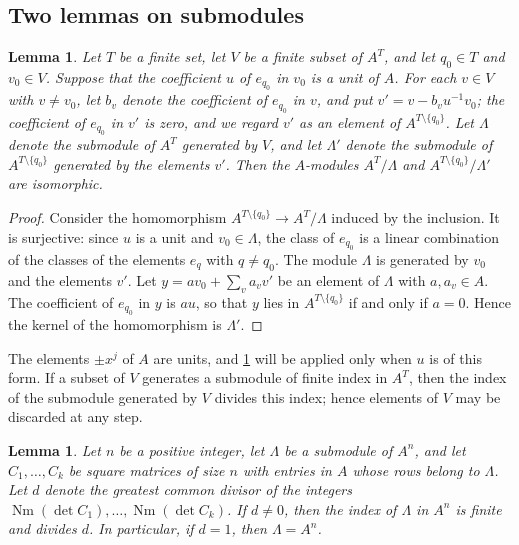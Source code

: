 \documentclass[11pt]{amsart}
\theoremstyle{plain}
\newtheorem{lemma}[theorem]{Lemma}
\theoremstyle{definition}
\begin{document}
\subsection{Two lemmas on submodules}

\begin{lemma} \label{lem:pivot}
Let $T$ be a finite set, let $V$ be a finite subset of $A^T$, and let $q_0 \in T$ and $v_0 \in V$.
Suppose that the coefficient $u$ of $e_{q_0}$ in $v_0$ is a unit of $A$.
For each $v \in V$ with $v \ne v_0$, let $b_v$ denote the coefficient of $e_{q_0}$ in $v$, and put $v' = v - b_v u^{-1} v_0$; the coefficient of $e_{q_0}$ in $v'$ is zero, and we regard $v'$ as an element of $A^{T \setminus \{q_0\}}$.
Let $\Lambda$ denote the submodule of $A^T$ generated by $V$, and let $\Lambda'$ denote the submodule of $A^{T \setminus \{q_0\}}$ generated by the elements $v'$.
Then the $A$-modules $A^T/\Lambda$ and $A^{T \setminus \{q_0\}}/\Lambda'$ are isomorphic.
\end{lemma}

\begin{proof}
Consider the homomorphism $A^{T \setminus \{q_0\}} \to A^T/\Lambda$ induced by the inclusion.
It is surjective: since $u$ is a unit and $v_0 \in \Lambda$, the class of $e_{q_0}$ is a linear combination of the classes of the elements $e_q$ with $q \ne q_0$.
The module $\Lambda$ is generated by $v_0$ and the elements $v'$.
Let $y = a v_0 + \sum_{v} a_v v'$ be an element of $\Lambda$ with $a, a_v \in A$.
The coefficient of $e_{q_0}$ in $y$ is $au$, so that $y$ lies in $A^{T \setminus \{q_0\}}$ if and only if $a = 0$.
Hence the kernel of the homomorphism is $\Lambda'$.
\end{proof}

The elements $\pm x^j$ of $A$ are units, and \cref{lem:pivot} will be applied only when $u$ is of this form.
If a subset of $V$ generates a submodule of finite index in $A^T$, then the index of the submodule generated by $V$ divides this index; hence elements of $V$ may be discarded at any step.

\begin{lemma} \label{lem:det}
Let $n$ be a positive integer, let $\Lambda$ be a submodule of $A^n$, and let $C_1, \dots, C_k$ be square matrices of size $n$ with entries in $A$ whose rows belong to $\Lambda$.
Let $d$ denote the greatest common divisor of the integers $\operatorname{Nm}(\det C_1), \dots, \operatorname{Nm}(\det C_k)$.
If $d \ne 0$, then the index of $\Lambda$ in $A^n$ is finite and divides $d$.
In particular, if $d = 1$, then $\Lambda = A^n$.
\end{lemma}
\end{document}
